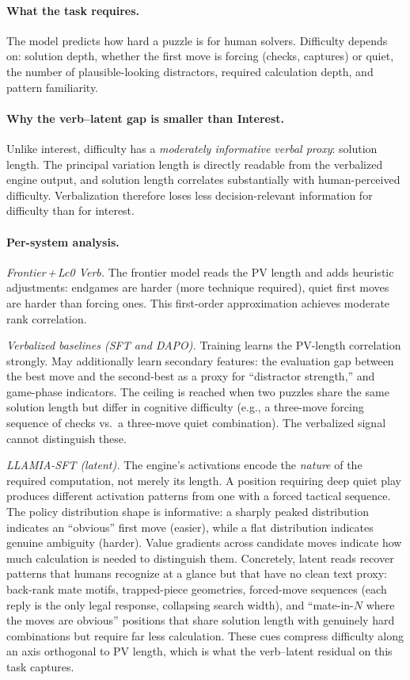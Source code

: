\paragraph{What the task requires.}
The model predicts how hard a puzzle is for human solvers.
Difficulty depends on: solution depth, whether the first move is forcing
(checks, captures) or quiet, the number of plausible-looking distractors,
required calculation depth, and pattern familiarity.

\paragraph{Why the verb--latent gap is smaller than Interest.}
Unlike interest, difficulty has a \emph{moderately informative verbal
proxy}: solution length.
The principal variation length is directly readable from the verbalized engine
output, and solution length correlates substantially with human-perceived
difficulty.
Verbalization therefore loses less decision-relevant information for
difficulty than for interest.

\paragraph{Per-system analysis.}

\emph{Frontier\,+\,Lc0 Verb.}
The frontier model reads the PV length and adds heuristic adjustments:
endgames are harder (more technique required), quiet first moves are harder
than forcing ones.
This first-order approximation achieves moderate rank correlation.

\emph{Verbalized baselines (SFT and DAPO).}
Training learns the PV-length correlation strongly.
May additionally learn secondary features: the evaluation gap between the
best move and the second-best as a proxy for ``distractor strength,'' and
game-phase indicators.
The ceiling is reached when two puzzles share the same solution length but
differ in cognitive difficulty (e.g., a three-move forcing sequence of checks
vs.\ a three-move quiet combination).
The verbalized signal cannot distinguish these.

\emph{LLAMIA-SFT (latent).}
The engine's activations encode the \emph{nature} of the required
computation, not merely its length.
A position requiring deep quiet play produces different activation patterns
from one with a forced tactical sequence.
The policy distribution shape is informative: a sharply peaked distribution
indicates an ``obvious'' first move (easier), while a flat distribution
indicates genuine ambiguity (harder).
Value gradients across candidate moves indicate how much calculation is
needed to distinguish them.
Concretely, latent reads recover patterns that humans recognize at a
glance but that have no clean text proxy: back-rank mate motifs,
trapped-piece geometries, forced-move sequences (each reply is the only
legal response, collapsing search width), and ``mate-in-$N$ where the
moves are obvious'' positions that share solution length with genuinely
hard combinations but require far less calculation.
These cues compress difficulty along an axis orthogonal to PV length,
which is what the verb--latent residual on this task captures.

